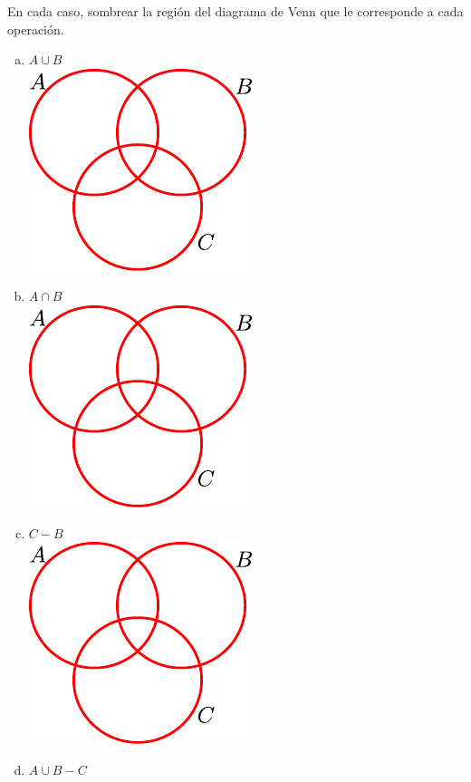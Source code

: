 \documentclass[11pt]{article}
\begin{document}
\begin{exercise}
En cada caso, sombrear la región del diagrama de Venn que le corresponde a cada operación.
\begin{multicols}{3}
    \begin{enumerate}[a)]
        \item $A \cup B$ \\
            \includegraphics[scale=0.7]{figs/fig-07.pdf}
        \item $A \cap B$ \\
            \includegraphics[scale=0.7]{figs/fig-07.pdf}
        \item $C - B$\\
            \includegraphics[scale=0.7]{figs/fig-07.pdf}
        \item $A \cup B - C$\\

\end{enumerate}
\end{multicols}
\end{exercise}
\end{document}
